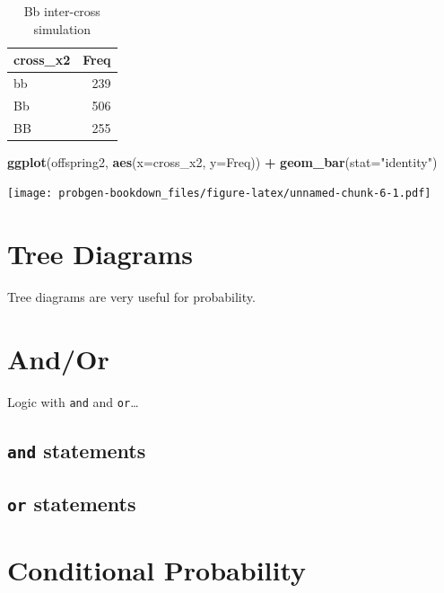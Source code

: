 \documentclass[]{book}
\newenvironment{Shaded}{\begin{snugshade}}{\end{snugshade}}
\newcommand{\KeywordTok}[1]{\textcolor[rgb]{0.13,0.29,0.53}{\textbf{#1}}}
\newcommand{\DataTypeTok}[1]{\textcolor[rgb]{0.13,0.29,0.53}{#1}}
\newcommand{\StringTok}[1]{\textcolor[rgb]{0.31,0.60,0.02}{#1}}
\newcommand{\OperatorTok}[1]{\textcolor[rgb]{0.81,0.36,0.00}{\textbf{#1}}}
\newcommand{\NormalTok}[1]{#1}
\theoremstyle{definition}
\theoremstyle{definition}
\theoremstyle{definition}
\theoremstyle{remark}
\begin{document}
\begin{table}

\caption{\label{tab:unnamed-chunk-6}Bb inter-cross simulation}
\centering
\begin{tabular}[t]{lr}
\toprule
cross\_x2 & Freq\\
\midrule
bb & 239\\
Bb & 506\\
BB & 255\\
\bottomrule
\end{tabular}
\end{table}

\begin{Shaded}
\begin{Highlighting}[]
\KeywordTok{ggplot}\NormalTok{(offspring2, }\KeywordTok{aes}\NormalTok{(}\DataTypeTok{x=}\NormalTok{cross_x2, }\DataTypeTok{y=}\NormalTok{Freq)) }\OperatorTok{+}\StringTok{ }\KeywordTok{geom_bar}\NormalTok{(}\DataTypeTok{stat=}\StringTok{"identity"}\NormalTok{)}
\end{Highlighting}
\end{Shaded}

\texttt{[image: probgen-bookdown\_files/figure-latex/unnamed-chunk-6-1.pdf]}

\chapter{Tree Diagrams}\label{trees}

Tree diagrams are very useful for probability.

\chapter{And/Or}\label{and-or}

Logic with \texttt{and} and \texttt{or}\ldots{}

\section{\texorpdfstring{\texttt{and}
statements}{and statements}}\label{and-statements}

\section{\texorpdfstring{\texttt{or}
statements}{or statements}}\label{or-statements}

\chapter{Conditional Probability}\label{conditional}
\end{document}
